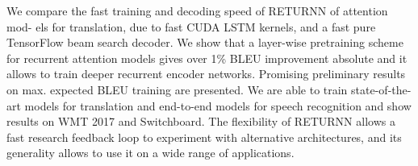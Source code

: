 We compare the fast training and decoding speed of RETURNN of attention mod- els for translation, due to fast CUDA LSTM kernels, and a fast pure TensorFlow beam search decoder. We show that a layer-wise pretraining scheme for recurrent attention models gives over 1\% BLEU improvement absolute and it allows to train deeper recurrent encoder networks. Promising preliminary results on max. expected BLEU training are presented. We are able to train state-of-the-art models for translation and end-to-end models for speech recognition and show results on WMT 2017 and Switchboard. The flexibility of RETURNN allows a fast research feedback loop to experiment with alternative architectures, and its generality allows to use it on a wide range of applications.
